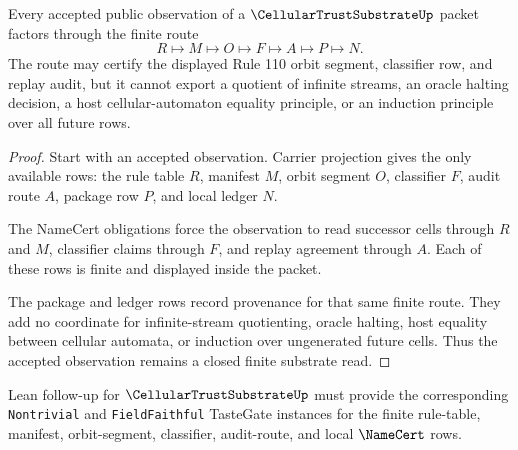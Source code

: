 \begin{theorem}
\label{thm:cellular-trust-substrate-closed-observation-nonescape}
Every accepted public observation of a $\CellularTrustSubstrateUp$ packet factors through the finite route
$$
R \longmapsto M \longmapsto O \longmapsto F \longmapsto A \longmapsto P \longmapsto N.
$$
The route may certify the displayed Rule 110 orbit segment, classifier row, and replay audit, but it cannot export a quotient of infinite streams, an oracle halting decision, a host cellular-automaton equality principle, or an induction principle over all future rows.
\end{theorem}
\begin{proof}
Start with an accepted observation. Carrier projection gives the only available rows: the rule table $R$, manifest $M$, orbit segment $O$, classifier $F$, audit route $A$, package row $P$, and local ledger $N$.

The NameCert obligations force the observation to read successor cells through $R$ and $M$, classifier claims through $F$, and replay agreement through $A$. Each of these rows is finite and displayed inside the packet.

The package and ledger rows record provenance for that same finite route. They add no coordinate for infinite-stream quotienting, oracle halting, host equality between cellular automata, or induction over ungenerated future cells. Thus the accepted observation remains a closed finite substrate read.
\end{proof}

Lean follow-up for $\CellularTrustSubstrateUp$ must provide the corresponding \texttt{Nontrivial} and \texttt{FieldFaithful} TasteGate instances for the finite rule-table, manifest, orbit-segment, classifier, audit-route, and local $\NameCert$ rows.
